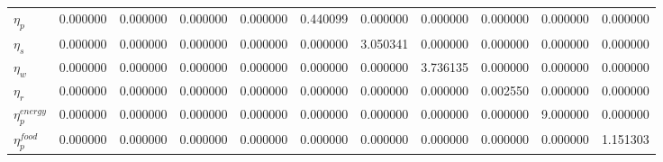\begin{center}
\begin{longtable}{lcccccccccc}
${\eta_p}           $	 & 	             0.000000	 & 	             0.000000	 & 	             0.000000	 & 	             0.000000	 & 	             0.440099	 & 	             0.000000	 & 	             0.000000	 & 	             0.000000	 & 	             0.000000	 & 	             0.000000 \\ 
${\eta_s}           $	 & 	             0.000000	 & 	             0.000000	 & 	             0.000000	 & 	             0.000000	 & 	             0.000000	 & 	             3.050341	 & 	             0.000000	 & 	             0.000000	 & 	             0.000000	 & 	             0.000000 \\ 
${\eta_w}           $	 & 	             0.000000	 & 	             0.000000	 & 	             0.000000	 & 	             0.000000	 & 	             0.000000	 & 	             0.000000	 & 	             3.736135	 & 	             0.000000	 & 	             0.000000	 & 	             0.000000 \\ 
${\eta_r}           $	 & 	             0.000000	 & 	             0.000000	 & 	             0.000000	 & 	             0.000000	 & 	             0.000000	 & 	             0.000000	 & 	             0.000000	 & 	             0.002550	 & 	             0.000000	 & 	             0.000000 \\ 
${\eta_p^{energy}}  $	 & 	             0.000000	 & 	             0.000000	 & 	             0.000000	 & 	             0.000000	 & 	             0.000000	 & 	             0.000000	 & 	             0.000000	 & 	             0.000000	 & 	             9.000000	 & 	             0.000000 \\ 
${\eta_p^{food}}    $	 & 	             0.000000	 & 	             0.000000	 & 	             0.000000	 & 	             0.000000	 & 	             0.000000	 & 	             0.000000	 & 	             0.000000	 & 	             0.000000	 & 	             0.000000	 & 	             1.151303 \\ 
\end{longtable}
 \end{center}
